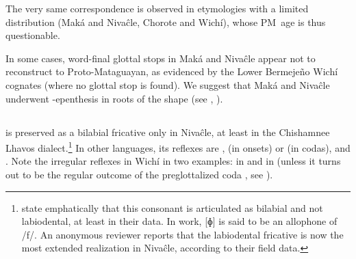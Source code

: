 The very same correspondence is observed in etymologies with a limited distribution (Maká and Nivaĉle, Chorote and Wichí), whose PM~age is thus questionable.

\begin{exe}
    \ex \locustmn
    \ex \hunger
    \ex \torn
    \ex \pacu
    \ex \heartmn
    \ex \yellowv
    \ex \durmili
    \ex \dirt
\end{exe}

In some cases, word-final glottal stops in Maká and Nivaĉle appear not to reconstruct to Proto-Mataguayan, as evidenced by the Lower Bermejeño Wichí cognates (where no glottal stop is found). We suggest that Maká and Nivaĉle underwent \mbox{-}epenthesis in roots of the shape  (see , ).

\begin{exe}
    \ex \thorne
    \ex \sleep
    \ex \penis
    \ex \worm
    \ex \belly
    \ex \price
    \ex \juice
\end{exe}

\subsection{}\label{proto-f}
 is preserved as a bilabial fricative only in Nivaĉle, at least in the Chishamnee Lhavos dialect.\footnote{\citet[29, 81]{LC20} state emphatically that this consonant is articulated as bilabial and not labiodental, at least in their data. In  work, [ɸ] is said to be an allophone of /f/. An anonymous reviewer reports that the labiodental fricative is now the most extended realization in Nivaĉle, according to their field data.} In other languages, its reflexes are ,  (in onsets) or  (in codas), and . Note the irregular reflexes in Wichí in two examples:  in  and  in  (unless it turns out to be the regular outcome of the preglottalized coda , see ).

\begin{exe}
    \ex \wing
    \ex \companion
    \ex \coal
    \ex \disease
    \ex \shoulder
    \ex \shoulderblade
    \ex \firef
    \ex \centipede
    \ex \cutdown
    \ex \algarrobof
    \ex \algarrobot
    \ex \rightn
    \ex \tell
    \ex \sisinlaw
    \ex \soninlaw
    \ex \fieldn
    \ex \flyv \label{f-flyv}
    \ex \mortar
    \ex \rootn
    \ex \notafraid
    \ex \coldweather
    \ex \hidev
    \ex \crab
    \ex \palmg
    \ex \leech
    \ex \fart
    \ex \neighbor
    \ex \spouse
    \ex \acquainted
    \ex \spend
    \ex \suckb \label{f-suckb}
    \ex \tsofa
    \ex \tsofatajf
    \ex \tsofatajt
    \ex \woman
    \ex \pigeon
\end{exe}

